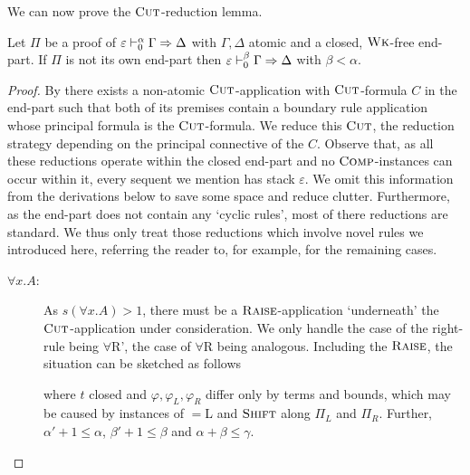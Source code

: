 We can now prove the $\RCut$-reduction lemma.

\begin{lemma}\label{lem:cons-cut-red}
  Let $\Pi$ be a proof of $\varepsilon \vdash^\alpha_0 \Gamma \Rightarrow \Delta$ with $\Gamma, \Delta$
  atomic and a closed, $\textsc{Wk}$-free end-part. If $\Pi$ is not its own end-part then $\varepsilon \vdash^\beta_0
  \Gamma \Rightarrow \Delta$ with $\beta < \alpha$.
\end{lemma}
\begin{proof}
  By  there exists a non-atomic $\RCut$-application with
  $\RCut$-formula $C$ in the
  end-part such that both of its premises contain a boundary rule application
  whose principal formula is the $\RCut$-formula. We reduce this $\RCut$,
  the reduction strategy depending on the principal connective of the $C$.
  Observe that, as all these reductions operate within the closed end-part and
  no $\textsc{Comp}$-instances can occur within it, every sequent we mention has stack
  $\varepsilon$. We omit this information from the derivations below to save
  some space and reduce clutter. Furthermore, as the end-part does not contain
  any `cyclic rules', most of there reductions are standard. We thus only treat
  those reductions which involve novel rules we introduced here, referring the
  reader to, for example, \parencite{mancosuIntroductionProofTheory2021} for the
  remaining cases.

  \begin{description}
  \item[$\forall x.A$:]
    As $s(\forall x.A) > 1$, there must be a $\RRaise$-application
    `underneath' the $\RCut$-application under consideration. We only handle the
    case of the right-rule being $\forall$R', the case of $\forall$R being
    analogous. Including the
    $\RRaise$, the situation can be sketched as follows
    \begin{comfproof}
      \LSC{$\RCut$}
      \DNC{$\Pi$}
      \LSC{$\RRaise$}
      \DOC{}
    \end{comfproof}
    where $t$ closed and $\varphi, \varphi_L, \varphi_R$ differ only by terms
    and bounds,
    which may be caused by instances of $=$L and $\textsc{Shift}$ along $\Pi_L$ and $\Pi_R$.
    Further, $\alpha' + 1 \leq \alpha$, $\beta' + 1 \leq \beta$ and $\alpha +
    \beta \leq \gamma$.


\end{description}
\end{proof}
